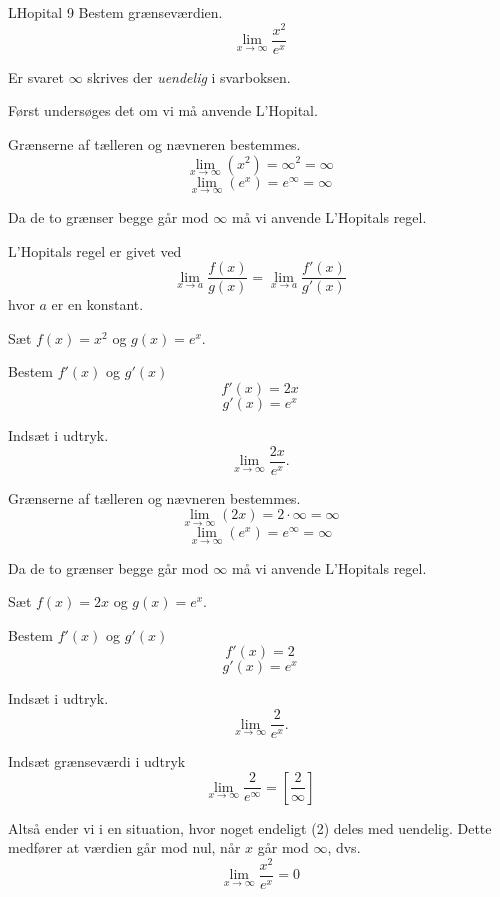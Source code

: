 \documentclass{article}
\begin{document}
\begin{exercise}{LHopital 9}
Bestem grænseværdien.
\[
\lim_{x \to \infty} \frac{x^2}{e^x}
\] 

Er svaret $\infty$ skrives der \emph{uendelig} i svarboksen.


\hint
Først undersøges det om vi må anvende L'Hopital.

\hint
Grænserne af tælleren og nævneren bestemmes.
\[
\lim_{x \to \infty} (x^2) = \infty ^2 = \infty 
\]
\[
\lim_{x \to \infty} (e^x) = e^\infty = \infty
\]

\hint
Da de to grænser begge går mod $\infty$ må vi  anvende L'Hopitals regel. 

\hint
L'Hopitals regel er givet ved
\[
\lim_{x \to a} \frac{f(x)}{g(x)} = \lim_{x \to a} \frac{f'(x)}{g'(x)} 
\]
hvor $a$  er en konstant.

\hint
Sæt $f(x) = x^2$ og $g(x) = e^x$. 

\hint
Bestem $f'(x)$ og $g'(x)$
\[
f'(x) = 2x
\]
\[
g'(x) = e^x
\]

\hint
Indsæt i udtryk.
\[
\lim_{x \to \infty} \frac{2x}{e^x}.
\]

\hint
Grænserne af tælleren og nævneren bestemmes.
\[
\lim_{x \to \infty} (2x) = 2 \cdot \infty  = \infty
\]
\[
\lim_{x \to \infty} (e^x) = e^\infty = \infty
\]

\hint
Da de to grænser begge går mod $\infty$ må vi  anvende L'Hopitals regel. 

	\hint
Sæt $f(x) = 2x$ og $g(x) = e^x$. 

\hint
Bestem $f'(x)$ og $g'(x)$
\[
f'(x) = 2
\]
\[
g'(x) = e^x
\]

\hint
Indsæt i udtryk.
\[
\lim_{x \to \infty} \frac{2}{e^x}.
\]


\hint
Indsæt grænseværdi i udtryk
\[
\lim_{x \to \infty} \frac{2}{e^\infty}  = \left[ \frac{2}{\infty}  \right] 
\]

\hint
Altså ender vi i en situation, hvor noget endeligt (2) deles med uendelig. Dette medfører at værdien går mod nul, når $x$ går mod $\infty$, dvs.
\[
\lim_{x \to \infty} \frac{x^2}{e^x} = 0
\]

\end{exercise}
\end{document}
